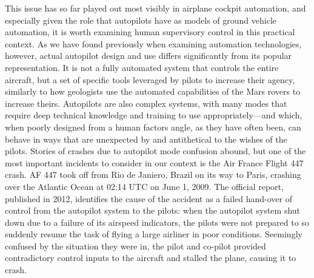 This issue has so far played out most visibly in airplane cockpit
automation, and especially given the role that autopilots have as
models of ground vehicle automation, it is worth examining human
supervisory control in this practical
context. As we have found previously when examining automation
technologies, however, actual autopilot design and use differs 
significantly from its popular representation. It is not a fully automated
system that controls the entire aircraft, but a set of specific tools
leveraged by pilots to increase their agency, similarly to how
geologists use the automated capabilities of the Mars rovers to
increase theirs. Autopilots are also complex systems, with many modes
that require deep technical knowledge and training to use
appropriately\cite{harrisPsych}---and which, when poorly designed from
a human factors 
angle, as they have often been, can behave in ways that are unexpected
by and antithetical to the wishes of the pilots. Stories of crashes
due to autopilot mode confusion abound, but one of the most important
incidents to consider in our context is the Air France Flight 447 crash. AF
447 took off from Rio de Janiero, Brazil on its way to Paris, crashing
over the Atlantic Ocean at 02:14 UTC on June 1, 2009. The official
report, published in 2012, identifies the cause of the accident as a
failed hand-over of control from the autopilot system to the pilots:
when the autopilot system shut down due to a failure of its airspeed
indicators, the pilots were not prepared to so suddenly resume the
task of flying a large airliner in poor conditions.\cite{AF447}
Seemingly confused by the situation they were in, the pilot and
co-pilot provided contradictory control inputs to the aircraft and
stalled the plane, causing it to crash. 


